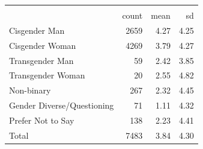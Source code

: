 \begin{tabular}{lrrr}
\toprule
                    &\multicolumn{3}{c}{}                  \\
                    &       count&        mean&          sd\\
\midrule
Cisgender Man       &        2659&        4.27&        4.25\\
Cisgender Woman     &        4269&        3.79&        4.27\\
Transgender Man     &          59&        2.42&        3.85\\
Transgender Woman   &          20&        2.55&        4.82\\
Non-binary          &         267&        2.32&        4.45\\
Gender Diverse/Questioning&          71&        1.11&        4.32\\
Prefer Not to Say   &         138&        2.23&        4.41\\
\midrule
Total               &        7483&        3.84&        4.30\\
\bottomrule \bottomrule
\end{tabular}
